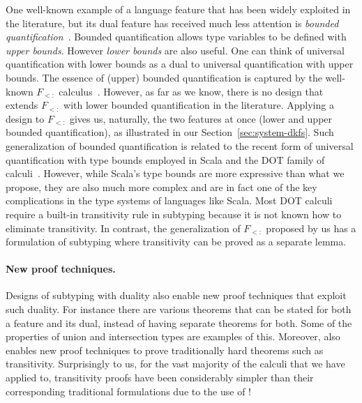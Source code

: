 One well-known example of a language feature that has been widely exploited in
the literature, but its dual feature has received much less attention
is \emph{bounded quantification}~\citep{cardelli1985understanding}.
Bounded quantification allows type variables to be defined with \emph{upper bounds}.
However \emph{lower bounds} are also useful. One can think of universal quantification
with lower bounds as a dual to universal quantification with upper bounds.
The essence of (upper) bounded quantification is captured by the well-known
$F_{<:}$ calculus~\citep{cardelli1985understanding}.
However, as far as we know, there is no design
that extends $F_{<:}$ with lower
bounded quantification in the literature.
Applying a \nameduo design to $F_{<:}$ gives
us, naturally, the two features at once (lower and upper bounded quantification), as illustrated
in our Section~\ref{sec:system-dkfs}.
Such generalization of bounded quantification is related to
the recent form of universal quantification with type bounds employed in Scala
and the DOT family of calculi~\citep{amin2012dependent}. However, while Scala's type bounds are more
expressive than what we propose, they are also much more complex and are in fact one of
the key complications in the type systems of languages like Scala.
Most DOT calculi require a built-in transitivity rule in subtyping
because it is not known how to eliminate transitivity. In contrast, the
generalization of $F_{<:}$ proposed by us has a formulation
of subtyping where transitivity can be
proved as a separate lemma.

\paragraph{New proof techniques.} Designs of subtyping with duality
also enable new proof techniques that exploit such duality. For instance
there are various theorems that can be stated for both a feature and its
dual, instead of having separate theorems for both. Some of the properties
of union and intersection types are examples of this. Moreover, \nameduo
also enables new proof techniques to prove traditionally hard theorems such as
transitivity. Surprisingly to us, for the vast majority of the calculi that
we have applied \nameduo to, transitivity proofs have been considerably simpler
than their corresponding traditional formulations due to the use of \nameduo! 

